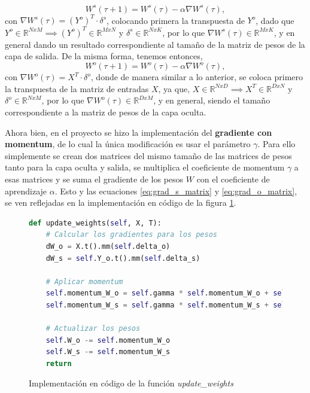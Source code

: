 \documentclass{article}
\begin{document}
\begin{equation}
    W^s(\tau + 1) = W^s(\tau) - \alpha \nabla W^s(\tau), \label{eq:grad_s_matrix}
\end{equation}
\noindent
con $\nabla W^s(\tau) = (Y^o)^T \cdot \delta^s$, colocando primera la transpuesta de $Y^o$, dado que $Y^o \in \mathbb{R}^{NxM} \implies (Y^o)^T \in \mathbb{R}^{MxN}$ y $\delta^s \in \mathbb{R}^{NxK}$, por lo que $\nabla W^s(\tau) \in \mathbb{R}^{MxK}$, y en general dando un resultado correspondiente al tamaño de la matriz de pesos de la capa de salida. De la misma forma, tenemos entonces, 
\begin{equation}
    W^o(\tau + 1) = W^o(\tau) - \alpha \nabla W^o(\tau), \label{eq:grad_o_matrix}
\end{equation}
\noindent
con $\nabla W^o(\tau) = X^T \cdot \delta^o$, donde de manera similar a lo anterior, se coloca primero la transpuesta de la matriz de entradas $X$, ya que, $X \in \mathbb{R}^{NxD} \implies X^T \in \mathbb{R}^{DxN}$ y $\delta^o \in \mathbb{R}^{NxM}$, por lo que $\nabla W^o(\tau) \in \mathbb{R}^{DxM}$, y en general, siendo el tamaño correspondiente a la matriz de pesos de la capa oculta. 
\medskip

Ahora bien, en el proyecto se hizo la implementación del \textbf{gradiente con momentum}, de lo cual la única modificación es usar el parámetro $\gamma$. Para ello simplemente se crean dos matrices del mismo tamaño de las matrices de pesos tanto para la capa oculta y salida, se multiplica el coeficiente de momentum $\gamma$ a esas matrices y se suma el gradiente de los pesos $W$ con el coeficiente de aprendizaje $\alpha$. Esto y las ecuaciones \ref{eq:grad_s_matrix} y \ref{eq:grad_o_matrix}, se ven reflejadas en la implementación en código de la figura \ref{code:update}. 

\begin{figure}[htbp]
\begin{lstlisting}[language=Python, texcl=true]
def update_weights(self, X, T):
    # Calcular los gradientes para los pesos
    dW_o = X.t().mm(self.delta_o)
    dW_s = self.Y_o.t().mm(self.delta_s)

    # Aplicar momentum
    self.momentum_W_o = self.gamma * self.momentum_W_o + self.alpha * dW_o
    self.momentum_W_s = self.gamma * self.momentum_W_s + self.alpha * dW_s

    # Actualizar los pesos
    self.W_o -= self.momentum_W_o
    self.W_s -= self.momentum_W_s
    return\end{lstlisting}
    \caption{Implementación en código de la función \textit{update\_weights}}
    \label{code:update}
\end{figure}
\end{document}
